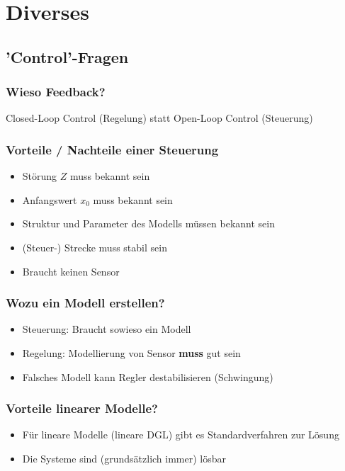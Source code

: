 \section{Diverses}

\subsection{'Control'-Fragen}

\subsubsection{Wieso Feedback?}

Closed-Loop Control (Regelung) statt Open-Loop Control (Steuerung)


\subsubsection{Vorteile / Nachteile einer Steuerung}

\begin{itemize}
	\item[-] Störung $Z$ muss bekannt sein
	\item[-] Anfangswert $x_0$ muss bekannt sein
	\item[-] Struktur und Parameter des Modells müssen bekannt sein
	\item[-] (Steuer-) Strecke muss stabil sein
	\item[+]    Braucht keinen Sensor 
\end{itemize}


\subsubsection{Wozu ein Modell erstellen?}

 \begin{itemize}
	\item Steuerung: Braucht sowieso ein Modell
	\item Regelung: Modellierung von Sensor \textbf{muss} gut sein
	\item Falsches Modell kann Regler destabilisieren (Schwingung)
 \end{itemize}


\subsubsection{Vorteile linearer Modelle?}

\begin{itemize}
	\item Für lineare Modelle (lineare DGL) gibt es Standardverfahren zur Lösung 
	\item Die Systeme sind (grundsätzlich immer) lösbar
\end{itemize}


